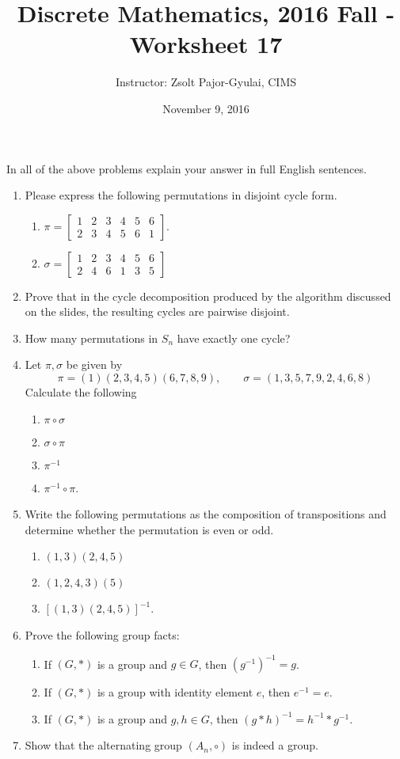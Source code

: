 \documentclass[11pt]{preprint}
\title{Discrete Mathematics, 2016 Fall - Worksheet 17}
\author{Instructor: Zsolt Pajor-Gyulai, CIMS}
\date{November 9, 2016}
\def\enumb{\begin{enumerate}}
\def\enume{\end{enumerate}}
\begin{document}
\maketitle

In all of the above problems explain your answer in full English sentences.

\enumb
\item Please express the following permutations in disjoint cycle form.
\enumb
\item $\pi=\left[\begin{array}{cccccc}
1&2&3&4&5&6\\
2&3&4&5&6&1
\end{array}\right]$.


\item $\sigma=\left[\begin{array}{cccccc}
1&2&3&4&5&6\\
2&4&6&1&3&5
\end{array}\right]$

\enume
\item Prove that in the cycle decomposition produced by the algorithm discussed on the slides, the resulting cycles are pairwise disjoint.



\item How many permutations in $S_n$ have exactly one cycle?


\item Let $\pi,\sigma$ be given by
\[
\pi=(1)(2,3,4,5)(6,7,8,9),\qquad\sigma=(1,3,5,7,9,2,4,6,8)
\]
Calculate the following
\enumb
\item $\pi\circ\sigma$
\item $\sigma\circ\pi$
\item $\pi^{-1}$
\item $\pi^{-1}\circ\pi$.
\enume

\item Write the following permutations as the composition of transpositions and determine whether the permutation is even or odd.
\enumb
\item $(1,3)(2,4,5)$
\item $(1,2,4,3)(5)$
\item $[(1,3)(2,4,5)]^{-1}$.
\enume

\item Prove the following group facts: 
\enumb
\item If $(G,*)$ is a group and $g\in G$, then $(g^{-1})^{-1}=g$.
\item  If $(G,*)$ is a group with identity element $e$, then $e^{-1}=e$.
\item If $(G,*)$ is a group and $g,h\in G$, then $(g*h)^{-1}=h^{-1}*g^{-1}$.
\enume

\item Show that the alternating group $(A_n,\circ)$ is indeed a group.
\enume
\end{document}
